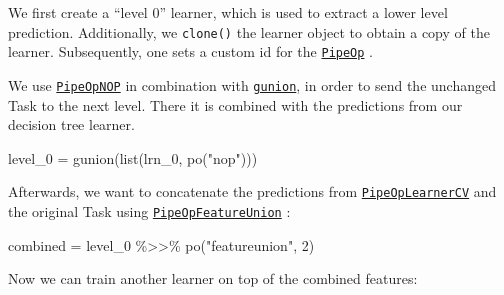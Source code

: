 \documentclass[
]{scrbook}
\newenvironment{Shaded}{\begin{snugshade}}{\end{snugshade}}
\newcommand{\DecValTok}[1]{\textcolor[rgb]{0.00,0.00,0.81}{#1}}
\newcommand{\FunctionTok}[1]{\textcolor[rgb]{0.00,0.00,0.00}{#1}}
\newcommand{\NormalTok}[1]{#1}
\newcommand{\OtherTok}[1]{\textcolor[rgb]{0.56,0.35,0.01}{#1}}
\newcommand{\SpecialCharTok}[1]{\textcolor[rgb]{0.00,0.00,0.00}{#1}}
\newcommand{\StringTok}[1]{\textcolor[rgb]{0.31,0.60,0.02}{#1}}
\renewenvironment{Shaded} {\begin{snugshade}\small} {\end{snugshade}}
\begin{document}
We first create a ``level 0'' learner, which is used to extract a lower level prediction.
Additionally, we \texttt{clone()} the learner object to obtain a copy of the learner.
Subsequently, one sets a custom id for the \href{https://mlr3pipelines.mlr-org.com/reference/PipeOp.html}{\texttt{PipeOp}} .

\begin{Shaded}
\end{Shaded}

We use \href{https://mlr3pipelines.mlr-org.com/reference/mlr_pipeops_nop.html}{\texttt{PipeOpNOP}} in combination with \href{https://mlr3pipelines.mlr-org.com/reference/gunion.html}{\texttt{gunion}}, in order to send the unchanged Task to the next level.
There it is combined with the predictions from our decision tree learner.

\begin{Shaded}
\begin{Highlighting}[]
\NormalTok{level\_0 }\OtherTok{=} \FunctionTok{gunion}\NormalTok{(}\FunctionTok{list}\NormalTok{(lrn\_0, }\FunctionTok{po}\NormalTok{(}\StringTok{"nop"}\NormalTok{)))}
\end{Highlighting}
\end{Shaded}

Afterwards, we want to concatenate the predictions from \href{https://mlr3pipelines.mlr-org.com/reference/mlr_pipeops_learner_cv.html}{\texttt{PipeOpLearnerCV}} and the original Task using \href{https://mlr3pipelines.mlr-org.com/reference/mlr_pipeops_featureunion.html}{\texttt{PipeOpFeatureUnion}} :

\begin{Shaded}
\begin{Highlighting}[]
\NormalTok{combined }\OtherTok{=}\NormalTok{ level\_0 }\SpecialCharTok{\%\textgreater{}\textgreater{}\%} \FunctionTok{po}\NormalTok{(}\StringTok{"featureunion"}\NormalTok{, }\DecValTok{2}\NormalTok{)}
\end{Highlighting}
\end{Shaded}

Now we can train another learner on top of the combined features:
\end{document}

